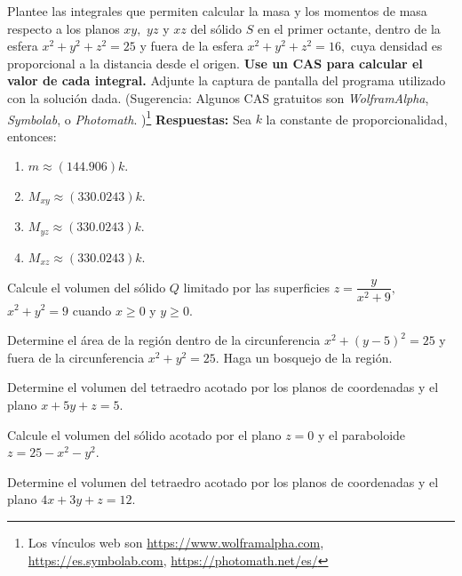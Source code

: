 \begin{prob}
Plantee las integrales que permiten calcular la masa y los momentos de masa respecto a los planos $xy,$ $yz$ y $xz$ del sólido $S$ en el primer octante, dentro de la esfera $x^2+y^2+z^2=25$ y fuera de la esfera $x^2+y^2+z^2=16,$ cuya densidad es proporcional a la distancia desde el origen. \textbf{Use un CAS para calcular el valor de cada integral.} Adjunte la captura de pantalla del programa utilizado con la solución dada. (Sugerencia: Algunos CAS gratuitos son \textit{WolframAlpha}\textregistered , \textit{Symbolab}\textregistered , o \textit{Photomath}\textregistered. )\footnote{Los vínculos web son \url{https://www.wolframalpha.com}, \url{https://es.symbolab.com}, \url{https://photomath.net/es/}}
\textbf{Respuestas:} Sea $k$ la constante de proporcionalidad, entonces: \begin{enumerate}
    \item $m\approx (144.906)k .$
    \item $M_{xy}\approx (330.0243)k .$
    \item $M_{yz}\approx (330.0243)k .$
    \item $M_{xz}\approx (330.0243)k  .$
\end{enumerate}
\end{prob}



\begin{prob}
Calcule el volumen del sólido $Q$ limitado por las superficies $z=\dfrac{y}{x^2+9},$ $x^2+y^2=9$ cuando $x\geq 0$ y $y\geq 0.$ 
\end{prob}


\begin{prob}
Determine el área de la región dentro de la circunferencia $x^2+(y-5)^2=25$ y fuera de la circunferencia $x^2+y^2=25.$ Haga un bosquejo de la región.
\end{prob}

\begin{prob}
Determine el volumen del tetraedro acotado por los planos de coordenadas y el plano $x+5y+z=5.$
\end{prob}


\begin{prob}
Calcule el volumen del sólido acotado por el plano $z=0$ y el paraboloide $z=25-x^2-y^2.$ 
\end{prob}


\begin{prob}
Determine el volumen del tetraedro acotado por los planos de coordenadas y el plano $4x+3y+z=12.$
\end{prob}

